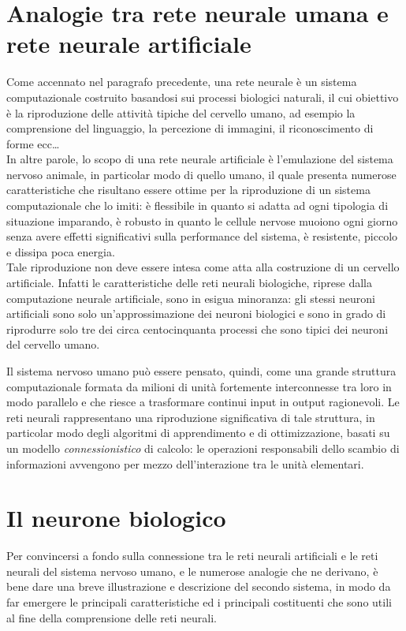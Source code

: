 \documentclass[12pt,a4paper,oneside]{book}
\begin{document}
		
		\section{Analogie tra rete neurale umana e rete neurale artificiale}
	
		Come accennato nel paragrafo precedente, una rete neurale è un sistema computazionale costruito basandosi sui processi biologici naturali, il cui obiettivo è la riproduzione delle attività tipiche del cervello umano, ad esempio la comprensione del linguaggio, la percezione di immagini, il riconoscimento di forme ecc\dots \\
		In altre parole, lo scopo di una rete neurale artificiale è l’emulazione del sistema nervoso animale, in particolar modo di quello umano, il quale presenta numerose caratteristiche che risultano essere ottime per la riproduzione di un sistema computazionale che lo imiti: è flessibile in quanto si adatta ad ogni tipologia di situazione imparando, è robusto in quanto le cellule nervose muoiono ogni giorno senza avere effetti significativi sulla performance del sistema, è resistente, piccolo e dissipa poca energia. \\
		Tale riproduzione non deve essere intesa come atta alla costruzione di un cervello artificiale. Infatti le caratteristiche delle reti neurali biologiche, riprese dalla computazione neurale artificiale, sono in esigua minoranza: gli stessi neuroni artificiali sono solo un’approssimazione dei neuroni biologici e sono in grado di riprodurre solo tre dei circa centocinquanta processi che sono tipici dei neuroni del cervello umano. 
	
		Il sistema nervoso umano può essere pensato, quindi, come una grande struttura computazionale formata da milioni di unità fortemente interconnesse tra loro in modo parallelo e che riesce a trasformare continui input in output ragionevoli. Le reti neurali rappresentano una riproduzione significativa di tale struttura, in particolar modo degli algoritmi di apprendimento e di ottimizzazione, basati su un modello \emph{connessionistico} di calcolo: le operazioni responsabili dello scambio di informazioni avvengono per mezzo dell'interazione tra le unità elementari.
		
		\section{Il neurone biologico}
		Per convincersi a fondo sulla connessione tra le reti neurali artificiali e le reti neurali del sistema nervoso umano, e le numerose analogie che ne derivano, è bene dare una breve illustrazione e descrizione del secondo sistema, in modo da far emergere le principali caratteristiche ed i principali costituenti che sono utili al fine della comprensione delle reti neurali.
     	
\end{document}
